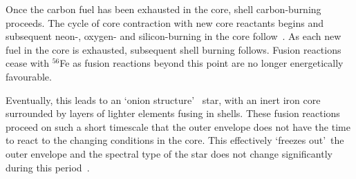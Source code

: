 \documentclass[a4paper,12pt]{article}
\begin{document}
Once the carbon fuel has been exhausted in the core, shell carbon-burning proceeds.
The cycle of core contraction with new core reactants begins and subsequent neon-, oxygen- and silicon-burning in the core follow~\citep{Woosley02}.
As each new fuel in the core is exhausted, subsequent shell burning follows. 
Fusion reactions cease with $^{56}$Fe as fusion reactions beyond this point are no longer energetically favourable.

Eventually, this leads to an \textquoteleft onion structure\textquoteright
~star, with an inert iron core surrounded by layers of lighter elements fusing in shells. 
These fusion reactions proceed on such a short timescale that the outer envelope does not have the time to react to the changing conditions in the core. 
This effectively \textquoteleft freezes out\textquoteright ~the outer envelope and the spectral type of the star does not change significantly during this period~\citep{Meynet11}.





\end{document}
